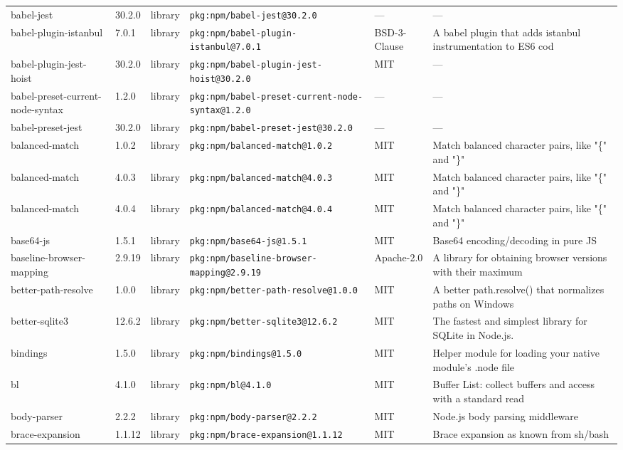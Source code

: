 \documentclass[11pt]{article}
\begin{document}
\begin{longtable}{|l|l|l|p{2.2cm}|l|p{4cm}|}
babel-jest & 30.2.0 & library & \texttt{pkg:npm/babel-jest@30.2.0} & — & — \\
babel-plugin-istanbul & 7.0.1 & library & \texttt{pkg:npm/babel-plugin-istanbul@7.0.1} & BSD-3-Clause & A babel plugin that adds istanbul instrumentation to ES6 cod \\
babel-plugin-jest-hoist & 30.2.0 & library & \texttt{pkg:npm/babel-plugin-jest-hoist@30.2.0} & MIT & — \\
babel-preset-current-node-syntax & 1.2.0 & library & \texttt{pkg:npm/babel-preset-current-node-syntax@1.2.0} & — & — \\
babel-preset-jest & 30.2.0 & library & \texttt{pkg:npm/babel-preset-jest@30.2.0} & — & — \\
balanced-match & 1.0.2 & library & \texttt{pkg:npm/balanced-match@1.0.2} & MIT & Match balanced character pairs, like "\{" and "\}" \\
balanced-match & 4.0.3 & library & \texttt{pkg:npm/balanced-match@4.0.3} & MIT & Match balanced character pairs, like "\{" and "\}" \\
balanced-match & 4.0.4 & library & \texttt{pkg:npm/balanced-match@4.0.4} & MIT & Match balanced character pairs, like "\{" and "\}" \\
base64-js & 1.5.1 & library & \texttt{pkg:npm/base64-js@1.5.1} & MIT & Base64 encoding/decoding in pure JS \\
baseline-browser-mapping & 2.9.19 & library & \texttt{pkg:npm/baseline-browser-mapping@2.9.19} & Apache-2.0 & A library for obtaining browser versions with their maximum  \\
better-path-resolve & 1.0.0 & library & \texttt{pkg:npm/better-path-resolve@1.0.0} & MIT & A better path.resolve() that normalizes paths on Windows \\
better-sqlite3 & 12.6.2 & library & \texttt{pkg:npm/better-sqlite3@12.6.2} & MIT & The fastest and simplest library for SQLite in Node.js. \\
bindings & 1.5.0 & library & \texttt{pkg:npm/bindings@1.5.0} & MIT & Helper module for loading your native module's .node file \\
bl & 4.1.0 & library & \texttt{pkg:npm/bl@4.1.0} & MIT & Buffer List: collect buffers and access with a standard read \\
body-parser & 2.2.2 & library & \texttt{pkg:npm/body-parser@2.2.2} & MIT & Node.js body parsing middleware \\
brace-expansion & 1.1.12 & library & \texttt{pkg:npm/brace-expansion@1.1.12} & MIT & Brace expansion as known from sh/bash \\

\end{longtable}
\end{document}
